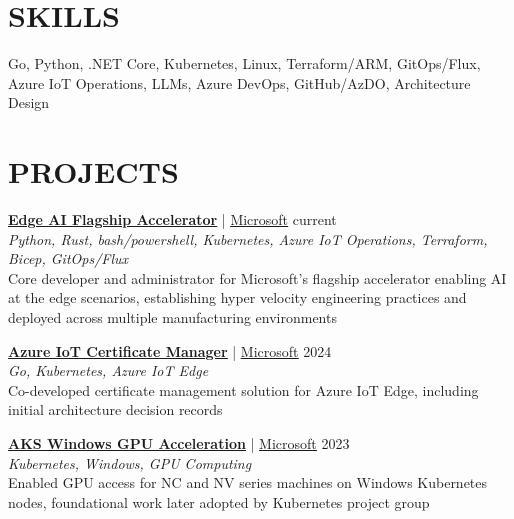 \documentclass[margin, 10pt, hidelinks]{res} %
\newcommand{\tab}{\hspace*{1em}} %
\newcommand{\emphasize}{\bf} %
\begin{document}
\begin{resume}
    \section{SKILLS}

    Go, Python, .NET Core, Kubernetes, Linux, Terraform/ARM, GitOps/Flux, Azure IoT Operations, LLMs,
    Azure DevOps, GitHub/AzDO, Architecture Design

    \section{PROJECTS}

    \href{https://github.com/microsoft/edge-ai}{\emphasize\underline{Edge AI Flagship Accelerator}} | \href{https://www.microsoft.com/}{\underline{Microsoft}} \hfill current \\
    {\it Python, Rust, bash/powershell, Kubernetes, Azure IoT Operations, Terraform, Bicep, GitOps/Flux} \\
    \tab Core developer and administrator for Microsoft's flagship accelerator enabling AI at the edge scenarios, establishing hyper velocity engineering practices and deployed across multiple manufacturing environments
    
    \href{https://github.com/katriendg/aio-cert-manager}{\emphasize\underline{Azure IoT Certificate Manager}} | \href{https://www.microsoft.com/}{\underline{Microsoft}} \hfill 2024 \\
    {\it Go, Kubernetes, Azure IoT Edge} \\
    \tab Co-developed certificate management solution for Azure IoT Edge, including initial architecture decision records
    
    \href{https://github.com/marosset/aks-windows-gpu-acceleration/pull/3}{\emphasize\underline{AKS Windows GPU Acceleration}} | \href{https://www.microsoft.com/}{\underline{Microsoft}} \hfill 2023 \\
    {\it Kubernetes, Windows, GPU Computing} \\
    \tab Enabled GPU access for NC and NV series machines on Windows Kubernetes nodes, foundational work later adopted by Kubernetes project group
    

\end{resume}
\end{document}
